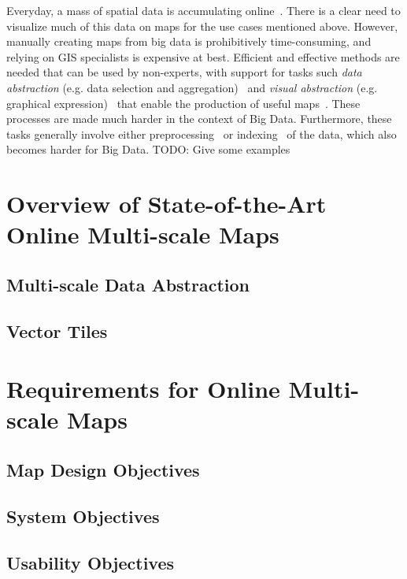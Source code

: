\documentclass[11pt, oneside]{report}   	%
\begin{document}
Everyday, a mass of spatial data is accumulating online~\cite{agrawal2012bigdata}. There is a clear need to visualize much of this data on maps for the use cases mentioned above. However, manually creating maps from big data is prohibitively time-consuming, and relying on GIS specialists is expensive at best. Efficient and effective methods are needed that can be used by non-experts, with support for tasks such \emph{data abstraction} (e.g. data selection and aggregation)~\cite{haunert2006landcover,schmid2013opensciencemap} and \emph{visual abstraction} (e.g. graphical expression)~\cite{jacques1967semiologie} that enable the production of useful maps~\cite{stolte2003multiscale,weibel1999generalising}. These processes are made much harder in the context of Big Data. Furthermore, these tasks generally involve either preprocessing~\cite{sarma2012fusiontables,kefaloukos2014declarative} or indexing~\cite{bereuter2013real,nutanong2012multiresolution} of the data, which also becomes harder for Big Data. TODO: Give some examples

\section{Overview of State-of-the-Art Online Multi-scale Maps}
\subsection{Multi-scale Data Abstraction}
\subsection{Vector Tiles}

\section{Requirements for Online Multi-scale Maps}
\subsection{Map Design Objectives}
\subsection{System Objectives}
\subsection{Usability Objectives}
\end{document}
